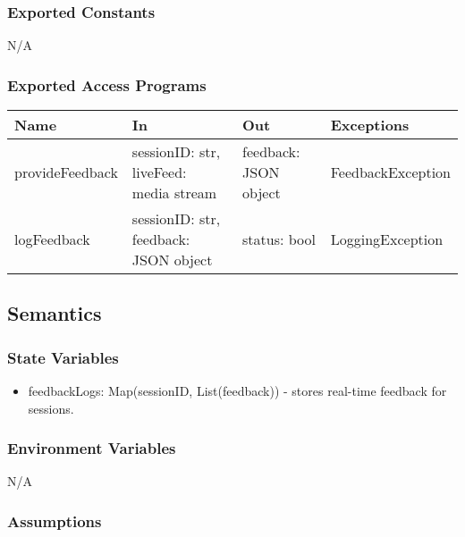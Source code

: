 \documentclass[12pt, titlepage]{article}
\begin{document}
\subsubsection{Exported Constants}

N/A

\subsubsection{Exported Access Programs}

\begin{center}
\begin{tabular}{p{3cm} p{4cm} p{4cm} p{5cm}}
\hline
\textbf{Name} & \textbf{In} & \textbf{Out} & \textbf{Exceptions} \\
\hline
provideFeedback & \raggedright\arraybackslash sessionID: str, liveFeed: media stream & \raggedright\arraybackslash feedback: JSON object & \raggedright\arraybackslash FeedbackException \\

logFeedback & \raggedright\arraybackslash sessionID: str, feedback: JSON object & \raggedright\arraybackslash status: bool & \raggedright\arraybackslash LoggingException \\
\hline
\end{tabular}
\end{center}

\subsection{Semantics}

\subsubsection{State Variables}

\begin{itemize}
\item feedbackLogs: Map(sessionID, List(feedback)) - stores real-time feedback for sessions.
\end{itemize}

\subsubsection{Environment Variables}

N/A

\subsubsection{Assumptions}
\end{document}
